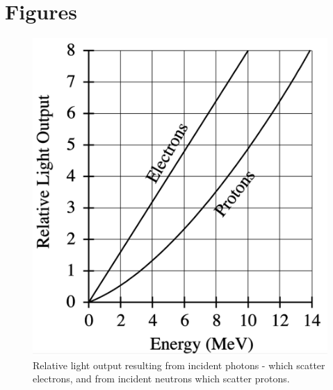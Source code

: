\documentclass{article}
\begin{document}
\section{Figures}
  \begin{figure}[!htb]
    \centering
    \includegraphics[scale=.5]{relative_response.png}
    \caption{Relative light output resulting from incident photons - which scatter electrons, and from incident neutrons which scatter protons.}
    \label{response}
  \end{figure}

  \hspace{.25cm}
\end{document}

